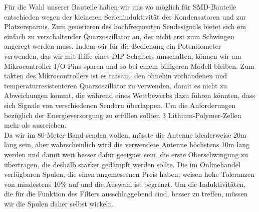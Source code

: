 Für die Wahl unserer Bauteile haben wir uns wo möglich für SMD-Bauteile entschieden wegen der kleineren Serieninduktivität der Kondensatoren und zur Platzersparnis.
Zum generieren des hochfrequenten Sendesignals bietet sich ein einfach zu verschaltender Quarzoszillator an, der nicht erst zum Schwingen angeregt werden muss. 
Indem wir für die Bedienung ein Potentiometer verwenden, das wir mit Hilfe eines DIP-Schalters umschalten, können wir am Mikrocontroller I/O-Pins sparen und so bei einem billigeren Modell bleiben. Zum takten des Mikrocontrollers ist es ratsam, den ohnehin vorhandenen und temperaturresistenteren Quarzoszillator zu verwenden, damit es nicht zu Abweichungen kommt, die während eines Wettbewerbs dazu führen könnten, dass sich Signale von verschiedenen Sendern überlappen. 
Um die Anforderungen bezüglich der Energieversorgung zu erfüllen sollten 3 Lithium-Polymer-Zellen mehr als ausreichen.\\
Da wir im 80-Meter-Band senden wollen, müsste die Antenne idealerweise 20m lang sein, aber wahrscheinlich wird die verwendete Antenne höchstens 10m lang werden und damit weit besser dafür geeignet sein, die erste Oberschwingung zu übertragen, die deshalb stärker gedämpft werden sollte. Die im Onlinehandel verfügbaren Spulen, die einen angemessenen Preis haben, weisen hohe Toleranzen von mindestens 10\% auf und die Auswahl ist begrenzt. Um die Induktivitäten, die für die Funktion des Filters ausschlaggebend sind, besser zu treffen, müssen wir die Spulen daher selbst wickeln.

